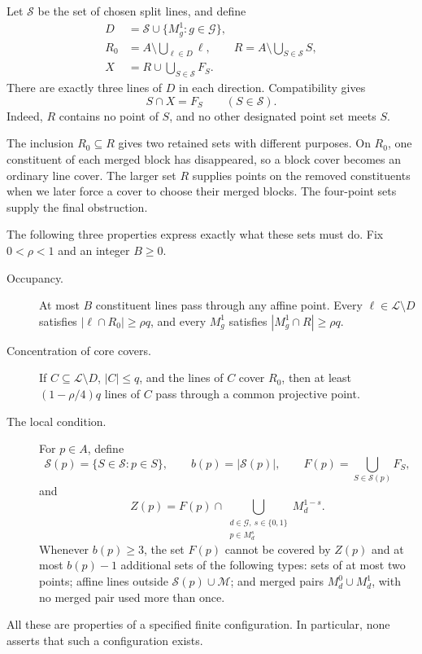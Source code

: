 

Let $\mathcal S$ be the set of chosen split lines, and define
\begin{equation}
 \begin{split}
 D&=\mathcal S\cup\{M_g^1:g\in\mathcal G\},\\
 R_0&=A\setminus\bigcup_{\ell\in D}\ell,
 \qquad R=A\setminus\bigcup_{S\in\mathcal S}S,\\
 X&=R\cup\bigcup_{S\in\mathcal S}F_S.
 \end{split}
 \label{eq:det-core}
\end{equation}
There are exactly three lines of $D$ in each direction.  Compatibility
gives
\begin{equation}
 S\cap X=F_S\qquad(S\in\mathcal S).
 \label{eq:det-split-intersection}
\end{equation}
Indeed, $R$ contains no point of $S$, and no other designated point set
meets $S$.

The inclusion $R_0\subseteq R$ gives two retained sets with different purposes. On $R_0$, one
constituent of each merged block has disappeared, so a block cover becomes
an ordinary line cover. The larger set $R$ supplies points on the removed
constituents when we later force a cover to choose their merged blocks.
The four-point sets supply the final obstruction.

The following three properties express exactly what these sets must do.
Fix $0<\rho<1$ and an integer $B\geq0$.
\begin{description}
 \item[Occupancy.] At most $B$ constituent lines pass through any affine
 point.  Every $\ell\in\mathcal L\setminus D$ satisfies
 $|\ell\cap R_0|\geq\rho q$, and every $M_g^1$ satisfies
 $|M_g^1\cap R|\geq\rho q$.
 \item[Concentration of core covers.] If
 $C\subseteq\mathcal L\setminus D$, $|C|\leq q$, and the lines of $C$
 cover $R_0$, then at least $(1-\rho/4)q$ lines of $C$ pass through a
 common projective point.
 \item[The local condition.] For $p\in A$, define
 \[
  \mathcal S(p)=\{S\in\mathcal S:p\in S\},\qquad
  b(p)=|\mathcal S(p)|,\qquad F(p)=\bigcup_{S\in\mathcal S(p)}F_S,
 \]
 and
 \begin{equation}
 Z(p)=F(p)\cap
 \bigcup_{\substack{d\in\mathcal G,\ s\in\{0,1\}\\p\in M_d^s}}
 M_d^{1-s}.
 \label{eq:det-partner-set}
 \end{equation}
 Whenever $b(p)\geq3$, the set $F(p)$ cannot be covered by $Z(p)$ and
 at most $b(p)-1$ additional sets of the following types: sets of at most
 two points; affine lines outside $\mathcal S(p)\cup\mathcal M$; and
 merged pairs $M_d^0\cup M_d^1$, with no merged pair used more than once.
\end{description}
All these are properties of a specified finite configuration.  In
particular, none asserts that such a configuration exists.

